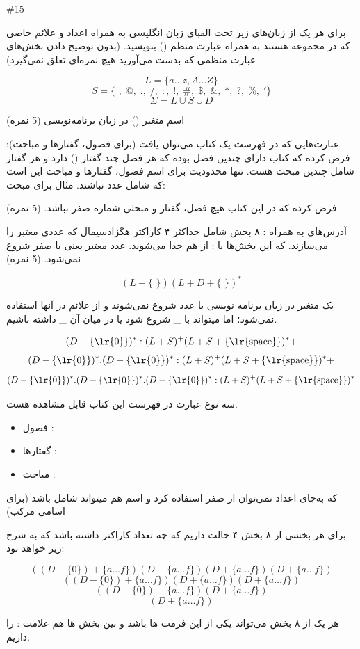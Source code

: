 \documentclass[../HW.tex]{subfiles}
\begin{document}
    
\question#{15}

برای هر یک از زبان‌های زیر تحت الفبای زبان انگلیسی به همراه اعداد و علائم خاصی که در مجموعه  هستند به همراه  عبارت منظم () بنویسید. (بدون توضیح دادن بخش‌های عبارت منظمی که بدست می‌آورید هیچ نمره‌ای تعلق نمی‌گیرد)

$$L = \{a \dots z, A \dots Z\}$$
$$S = \{\_, \; @, \; ., \; /, \; :, \; !, \; \#, \; \$, \; \&, \; *, \; ?, \; \%, \; '\}$$
$$\Sigma = L \cup S \cup D$$

 اسم متغیر () در زبان برنامه‌نویسی  (5 نمره)

 عبارت‌هایی که در فهرست یک کتاب می‌توان یافت (برای فصول، گفتارها و مباحث): فرض کرده که کتاب دارای چندین فصل بوده که هر فصل چند گفتار () دارد و هر گفتار شامل چندین مبحث هست. تنها محدودیت برای اسم فصول، گفتارها و مباحث این است که شامل عدد نباشند.
مثال برای مبحث: 

فرض کرده که در این کتاب هیچ فصل، گفتار و مبحثی شماره صفر نباشد. (5 نمره)

 آدرس‌های  به همراه : ۸ بخش شامل حداکثر ۴ کاراکتر هگزادسیمال که عددی معتبر را می‌سازند. که این بخش‌ها با : از هم جدا می‌شوند. عدد معتبر یعنی با صفر شروع نمی‌شود. (5 نمره)

\ifcompileanswers\solution

\textbf{}
$$ (L + \{\_\})(L + D + \{\_\})^* $$

یک متغیر در زبان برنامه نویسی با عدد شروع نمی‌شوند و از علائم در آنها استفاده نمی‌شود؛ اما میتواند با \_ شروع شود یا در میان آن \_ داشته باشیم.

\textbf{}
$$ (D - \{\text{\lr{0}}\})^* : (L + S)^+ (L + S + \{\text{\lr{space}}\})^* + $$
$$ (D - \{\text{\lr{0}}\})^* . (D - \{\text{\lr{0}}\})^* : (L + S)^+ (L + S + \{\text{\lr{space}}\})^* + $$
$$ (D - \{\text{\lr{0}}\})^* . (D - \{\text{\lr{0}}\})^* . (D - \{\text{\lr{0}}\})^* : (L + S)^+ (L + S + \{\text{\lr{space}}\})^* $$

سه نوع عبارت در فهرست این کتاب قابل مشاهده هست.
\begin{itemize}
    \item فصول : 
    \item گفتارها : 
    \item مباحث : 
\end{itemize}

که به‌جای اعداد نمی‌توان از صفر استفاده کرد و اسم هم میتواند شامل  باشد (برای اسامی مرکب)

\textbf{} برای هر بخشی از ۸ بخش ۴ حالت داریم که چه تعداد کاراکتر داشته باشد که به شرح زیر خواهد بود:

$$ ((D - \{0\}) + \{a \dots f\})(D + \{a \dots f\})(D + \{a \dots f\})(D + \{a \dots f\}) $$
$$ ((D - \{0\}) + \{a \dots f\})(D + \{a \dots f\})(D + \{a \dots f\}) $$
$$ ((D - \{0\}) + \{a \dots f\})(D + \{a \dots f\}) $$
$$ (D + \{a \dots f\}) $$

هر یک از ۸ بخش می‌تواند یکی از این فرمت ها باشد و بین بخش ها هم علامت : را داریم.


\fi
\end{document}
